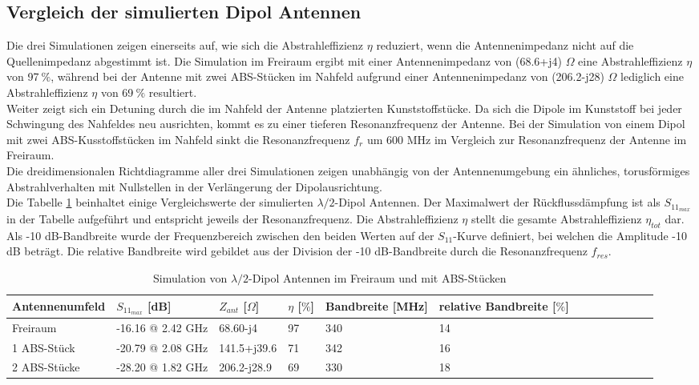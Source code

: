 \subsection{Vergleich der simulierten Dipol Antennen}\label{sec:VerglecihSimDipol}
Die drei Simulationen zeigen einerseits auf, wie sich die Abstrahleffizienz $\eta$ reduziert, wenn die Antennenimpedanz nicht auf die Quellenimpedanz abgestimmt ist. Die Simulation im Freiraum ergibt mit einer Antennenimpedanz von (68.6+j4) $\Omega$ eine Abstrahleffizienz $\eta$ von 97$\ \%$, während bei der Antenne mit zwei ABS-Stücken im Nahfeld aufgrund einer Antennenimpedanz von (206.2-j28) $\Omega$ lediglich eine Abstrahleffizienz $\eta$ von 69$\ \%$ resultiert. \\
Weiter zeigt sich ein Detuning durch die im Nahfeld der Antenne platzierten Kunststoffstücke. Da sich die Dipole im Kunststoff bei jeder Schwingung des Nahfeldes neu ausrichten, kommt es zu einer tieferen Resonanzfrequenz der Antenne. Bei der Simulation von einem Dipol mit zwei ABS-Kusstoffstücken im Nahfeld sinkt die Resonanzfrequenz $f_{r}$ um 600 MHz im Vergleich zur Resonanzfrequenz der Antenne im Freiraum.\\ 
Die dreidimensionalen Richtdiagramme aller drei Simulationen zeigen unabhängig von der Antennenumgebung ein ähnliches, torusförmiges Abstrahlverhalten mit Nullstellen in der Verlängerung der Dipolausrichtung.\\
Die Tabelle \ref{tab:Evaluation_Vergeich_Dipol Antennen} beinhaltet einige Vergleichswerte der simulierten $\lambda/2$-Dipol Antennen. Der Maximalwert der Rückflussdämpfung ist als $S_{11_{max}}$ in der Tabelle aufgeführt und entspricht jeweils der Resonanzfrequenz. Die Abstrahleffizienz $\eta$ stellt die gesamte Abstrahleffizienz $\eta_{tot}$ dar. Als -10 dB-Bandbreite wurde der Frequenzbereich zwischen den beiden Werten auf der $S_{11}$-Kurve definiert, bei welchen die Amplitude -10 dB beträgt. Die relative Bandbreite wird gebildet aus der Division der -10 dB-Bandbreite durch die Resonanzfrequenz $f_{res}$.
\begin{table}[!h]
 \centering
 \begin{tabular}{p{3cm} p{4cm} p{2cm} p{1.5cm} p{2cm} p{2.5cm} l c c c c p r} 
 \toprule 
 Antennenumfeld & $S_{11_{max}}$ [dB]		& $Z_{ant}$ [$\Omega$] 	& $\eta$ [$\%$] & Bandbreite [MHz] & relative Bandbreite [$\%$]\\ 
 \midrule
 Freiraum 			&	-16.16 @ 2.42 GHz		& 	68.60-j4			& 	97	&	340 & 14\\ 		
1 ABS-Stück 	& -20.79 @ 2.08 GHz 		&	141.5+j39.6		&	71	&	342	 & 16 \\
2 ABS-Stücke 	& -28.20 @ 1.82 GHz 	&	206.2-j28.9		&	69	&	330	 & 18 \\
 \bottomrule
 \end{tabular}
 \caption{Simulation von $\lambda/2$-Dipol Antennen im Freiraum und mit ABS-Stücken}
 \label{tab:Evaluation_Vergeich_Dipol Antennen}
\end{table}

